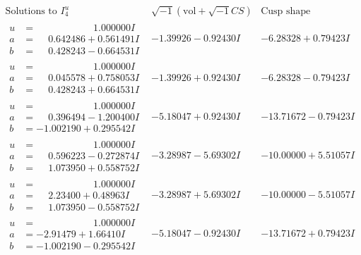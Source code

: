 \documentclass[1p]{elsarticle_modified}
\theoremstyle{definition}
\newcommand{\I}{\sqrt{-1}}
\begin{document}
$$\begin{array}{c|c|c}  
\text{Solutions to }I^u_{4}& \I (\text{vol} + \sqrt{-1}CS) & \text{Cusp shape}\\
 \hline 
\begin{aligned}
u &= \phantom{-0.000000 -}1.000000 I \\
a &= \phantom{-}0.642486 + 0.561491 I \\
b &= \phantom{-}0.428243 - 0.664531 I\end{aligned}
 & -1.39926 - 0.92430 I & -6.28328 + 0.79423 I \\ \hline\begin{aligned}
u &= \phantom{-0.000000 -}1.000000 I \\
a &= \phantom{-}0.045578 + 0.758053 I \\
b &= \phantom{-}0.428243 + 0.664531 I\end{aligned}
 & -1.39926 + 0.92430 I & -6.28328 - 0.79423 I \\ \hline\begin{aligned}
u &= \phantom{-0.000000 -}1.000000 I \\
a &= \phantom{-}0.396494 - 1.200400 I \\
b &= -1.002190 + 0.295542 I\end{aligned}
 & -5.18047 + 0.92430 I & -13.71672 - 0.79423 I \\ \hline\begin{aligned}
u &= \phantom{-0.000000 -}1.000000 I \\
a &= \phantom{-}0.596223 - 0.272874 I \\
b &= \phantom{-}1.073950 + 0.558752 I\end{aligned}
 & -3.28987 - 5.69302 I & -10.00000 + 5.51057 I \\ \hline\begin{aligned}
u &= \phantom{-0.000000 -}1.000000 I \\
a &= \phantom{-}2.23400 + 0.48963 I \\
b &= \phantom{-}1.073950 - 0.558752 I\end{aligned}
 & -3.28987 + 5.69302 I & -10.00000 - 5.51057 I \\ \hline\begin{aligned}
u &= \phantom{-0.000000 -}1.000000 I \\
a &= -2.91479 + 1.66410 I \\
b &= -1.002190 - 0.295542 I\end{aligned}
 & -5.18047 - 0.92430 I & -13.71672 + 0.79423 I \\ \hline\begin{aligned}

\end{aligned}
\end{array}$$
\end{document}
